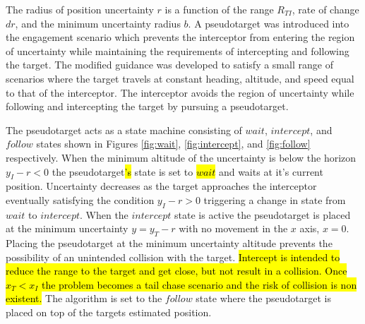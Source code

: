 \documentclass[conference]{IEEEtran}
\begin{document}
The radius of position uncertainty $r$ is a function of the range $R_{TI}$, rate of change $dr$, and the minimum uncertainty radius $b$. A pseudotarget was introduced into the engagement scenario which prevents the interceptor from entering the region of uncertainty while maintaining the requirements of intercepting and following the target. The modified guidance was developed to satisfy a small range of scenarios where the target travels at constant heading, altitude, and speed equal to that of the interceptor. The interceptor avoids the region of uncertainty while following and intercepting the target by pursuing a pseudotarget. 



The pseudotarget acts as a state machine consisting of $wait$, $intercept$, and $follow$ states shown in Figures \ref{fig:wait}, \ref{fig:intercept}, and \ref{fig:follow} respectively. When the minimum altitude of the uncertainty is below the horizon $y_I-r<0$ the pseudotarget\hl{'s} state is set to \hl{$wait$} and waits at it's current position. Uncertainty decreases as the target approaches the interceptor eventually satisfying the condition $y_I-r >0$ triggering a change in state from $wait$ to $intercept$. When the $intercept$ state is active the pseudotarget is placed at the minimum uncertainty $y=y_T-r$ with no movement in the $x$ axis, $x=0$. Placing the pseudotarget at the minimum uncertainty altitude prevents the possibility of an unintended collision with the target. \hl{Intercept is intended to reduce the range to the target and get close, but not result in a collision. Once $x_T<x_I$ the problem becomes a tail chase scenario and the risk of collision is non existent.} The algorithm is set to the $follow$ state where the pseudotarget is placed on top of the targets estimated position. 






\end{document}
